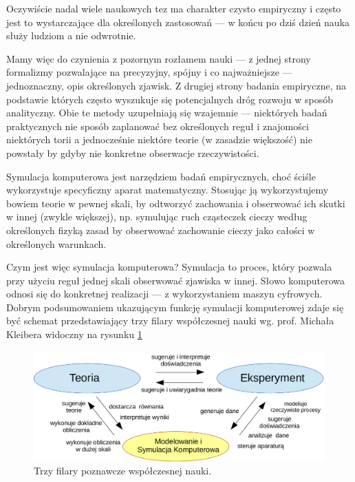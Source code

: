 \par{
Oczywiście nadal wiele naukowych tez ma charakter czysto empiryczny i często jest to wystarczające dla określonych zastosowań --- w końcu po dziś dzień nauka służy ludziom a nie odwrotnie.
}

\par{
Mamy więc do czynienia z pozornym rozłamem nauki --- z jednej strony formalizmy pozwalające na precyzyjny, spójny i co najważniejsze --- jednoznaczny, opis określonych zjawisk. Z drugiej strony badania empiryczne, na podstawie których często wyszukuje się potencjalnych dróg rozwoju w sposób analityczny. Obie te metody uzupełniają się wzajemnie --- niektórych badań praktycznych nie sposób zaplanować bez określonych reguł i znajomości niektórych torii a jednocześnie niektóre teorie (w zasadzie większość) nie powstały by gdyby nie konkretne obserwacje rzeczywistości.
}

\par{
Symulacja komputerowa jest narzędziem badań empirycznych, choć ściśle wykorzystuje specyficzny aparat matematyczny. Stosując ją wykorzystujemy bowiem teorie w pewnej skali, by odtworzyć zachowania i obserwować ich skutki w innej (zwykle większej), np. symulując ruch cząsteczek cieczy według określonych fizyką zasad by obserwować zachowanie cieczy jako całości w określonych warunkach.
}

\par{
Czym jest więc symulacja komputerowa? Symulacja to proces, który pozwala przy użyciu reguł jednej skali obserwować zjawiska w innej. Słowo komputerowa odnosi się do konkretnej realizacji --- z wykorzystaniem maszyn cyfrowych. Dobrym podsumowaniem ukazującym funkcję symulacji komputerowej zdaje się być schemat przedstawiający trzy filary współczesnej nauki wg. prof. Michała Kleibera \cite{Kleiber} widoczny na rysunku \ref{filaryNauki}
\begin{figure}[htb]
    \begin{center}
	\includegraphics[angle=0,scale=0.4]{img/triada_poznania.png}
	\caption{Trzy filary poznawcze współczesnej nauki.}
	\label{filaryNauki}
    \end{center}
\end{figure}
}

